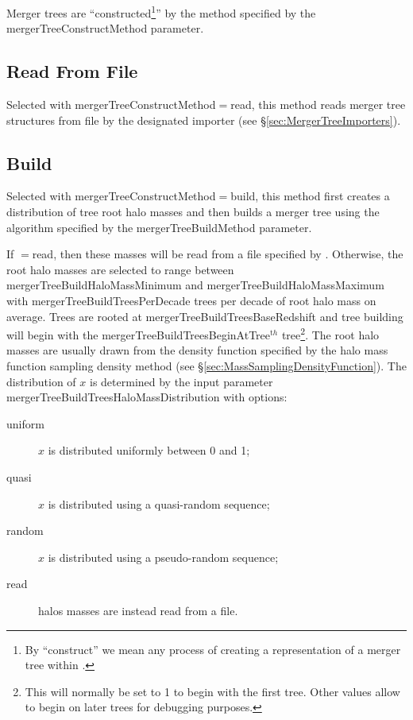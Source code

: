 Merger trees are ``constructed\footnote{By ``construct'' we mean any process of creating a representation of a merger tree within \protect\glc.}'' by the method specified by the {\normalfont \ttfamily mergerTreeConstructMethod} parameter.

\subsection{Read From File}

Selected with {\normalfont \ttfamily mergerTreeConstructMethod}$=${\normalfont \ttfamily read}, this method reads merger tree structures from file by the designated importer (see \S\ref{sec:MergerTreeImporters}).

\subsection{Build}

Selected with {\normalfont \ttfamily mergerTreeConstructMethod}$=${\normalfont \ttfamily build}, this method first creates a distribution of tree root halo masses and then builds a merger tree using the algorithm specified by the {\normalfont \ttfamily mergerTreeBuildMethod} parameter.

If {\normalfont \ttfamily [mergerTreeBuildTreesHaloMassDistribution]}$=${\normalfont \ttfamily read}, then these masses will be read from a file specified by {\normalfont \ttfamily [mergerTreeBuildTreeMassesFile]}. Otherwise, the root halo masses are selected to range between {\normalfont \ttfamily mergerTreeBuildHaloMassMinimum} and {\normalfont \ttfamily mergerTreeBuildHaloMassMaximum} with {\normalfont \ttfamily mergerTreeBuildTreesPerDecade} trees per decade of root halo mass on average. Trees are rooted at {\normalfont \ttfamily mergerTreeBuildTreesBaseRedshift} and tree building will begin with the {\normalfont \ttfamily mergerTreeBuildTreesBeginAtTree}$^{\mathrm th}$ tree\footnote{This will normally be set to 1 to begin with the first tree. Other values allow to begin on later trees for debugging purposes.}. The root halo masses are usually drawn from the density function specified by the halo mass function sampling density method (see \S\ref{sec:MassSamplingDensityFunction}). The distribution of $x$ is determined by the input parameter {\normalfont \ttfamily mergerTreeBuildTreesHaloMassDistribution} with options:
\begin{description}
 \item [{\normalfont \ttfamily uniform}] $x$ is distributed uniformly between 0 and 1;
 \item [{\normalfont \ttfamily quasi}] $x$ is distributed using a quasi-random sequence;
 \item [{\normalfont \ttfamily random}] $x$ is distributed using a pseudo-random sequence;
 \item [{\normalfont \ttfamily read}] halos masses are instead read from a file.
\end{description}

